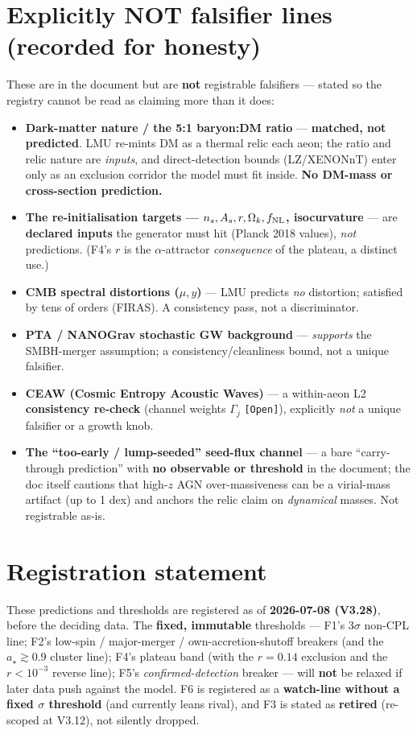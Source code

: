 \documentclass[11pt,a4paper]{article}
\newcommand{\st}[1]{\texttt{[#1]}}
\begin{document}
\section*{Explicitly NOT falsifier lines (recorded for honesty)}
These are in the document but are \textbf{not} registrable falsifiers --- stated so the registry cannot be read as claiming more than it does:
\begin{itemize}
\item \textbf{Dark-matter nature / the 5:1 baryon:DM ratio} --- \textbf{matched, not predicted}. LMU re-mints DM as a thermal relic each aeon; the ratio and relic nature are \emph{inputs}, and direct-detection bounds (LZ/XENONnT) enter only as an exclusion corridor the model must fit inside. \textbf{No DM-mass or cross-section prediction.}
\item \textbf{The re-initialisation targets --- $n_s,A_s,r,\Omega_k,f_{\rm NL}$, isocurvature} --- are \textbf{declared inputs} the generator must hit (Planck 2018 values), \emph{not} predictions. (F4's $r$ is the $\alpha$-attractor \emph{consequence} of the plateau, a distinct use.)
\item \textbf{CMB spectral distortions ($\mu,y$)} --- LMU predicts \emph{no} distortion; satisfied by tens of orders (FIRAS). A consistency pass, not a discriminator.
\item \textbf{PTA / NANOGrav stochastic GW background} --- \emph{supports} the SMBH-merger assumption; a consistency/cleanliness bound, not a unique falsifier.
\item \textbf{CEAW (Cosmic Entropy Acoustic Waves)} --- a within-aeon L2 \textbf{consistency re-check} (channel weights $\Gamma_j$ \st{Open}), explicitly \emph{not} a unique falsifier or a growth knob.
\item \textbf{The ``too-early / lump-seeded'' seed-flux channel} --- a bare ``carry-through prediction'' with \textbf{no observable or threshold} in the document; the doc itself cautions that high-$z$ AGN over-massiveness can be a virial-mass artifact (up to 1 dex) and anchors the relic claim on \emph{dynamical} masses. Not registrable as-is.
\end{itemize}

\hrulefill

\section*{Registration statement}
These predictions and thresholds are registered as of \textbf{2026-07-08 (V3.28)}, before the deciding data. The \textbf{fixed, immutable} thresholds --- F1's $3\sigma$ non-CPL line; F2's low-spin / major-merger / own-accretion-shutoff breakers (and the $a_\star\gtrsim0.9$ cluster line); F4's plateau band (with the $r=0.14$ exclusion and the $r<10^{-3}$ reverse line); F5's \emph{confirmed-detection} breaker --- will \textbf{not} be relaxed if later data push against the model. F6 is registered as a \textbf{watch-line without a fixed $\sigma$ threshold} (and currently leans rival), and F3 is stated as \textbf{retired} (re-scoped at V3.12), not silently dropped.
\end{document}
